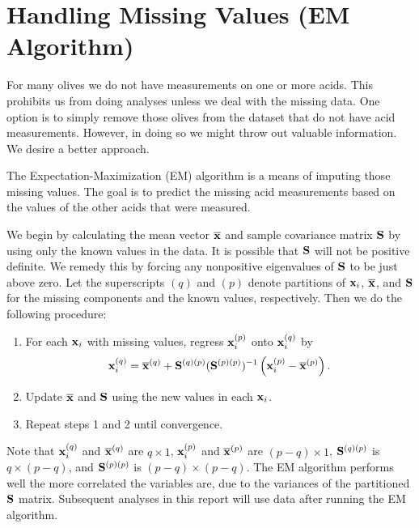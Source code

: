 \section{Handling Missing Values (EM Algorithm)}

For many olives we do not have measurements on one or more acids. This prohibits us from doing analyses unless we deal with the missing data. One option is to simply remove those olives from the dataset that do not have acid measurements. However, in doing so we might throw out valuable information. We desire a better approach.

The Expectation-Maximization (EM) algorithm is a means of imputing those missing values. The goal is to predict the missing acid measurements based on the values of the other acids that were measured.

We begin by calculating the mean vector $\overline{\mathbf{\bm{x}}}$ and sample covariance matrix $\mathbf{\bm{S}}$ by using only the known values in the data. It is possible that $\mathbf{\bm{S}}$ will not be positive definite. We remedy this by forcing any nonpositive eigenvalues of $\mathbf{\bm{S}}$ to be just above zero. Let the superscripts $(q)$ and $(p)$ denote partitions of $\mathbf{\bm{x}}_i$, $\overline{\mathbf{\bm{x}}}$, and $\mathbf{\bm{S}}$ for the missing components and the known values, respectively. Then we do the following procedure:

\begin{enumerate}
\item For each $\mathbf{\bm{x}}_i$ with missing values, regress $\mathbf{\bm{x}}_i^{(p)}$ onto $\mathbf{\bm{x}}_i^{(q)}$ by
\begin{eqnarray*}
\mathbf{\bm{x}}_i^{(q)} = \overline{\mathbf{\bm{x}}}^{(q)} + \mathbf{\bm{S}}^{(q)(p)}(\mathbf{\bm{S}}^{(p)(p)})^{-1}\left(\mathbf{\bm{x}}_i^{(p)}-\overline{\mathbf{\bm{x}}}^{(p)}\right). 
\end{eqnarray*}
\item Update $\overline{\mathbf{\bm{x}}}$ and $\mathbf{\bm{S}}$ using the new values in each $\mathbf{\bm{x}}_i$.
\item Repeat steps 1 and 2 until convergence.
\end{enumerate}

\noindent Note that $\mathbf{\bm{x}}_i^{(q)}$ and $\overline{\mathbf{\bm{x}}}^{(q)}$ are $q\times1$, $\mathbf{\bm{x}}_i^{(p)}$ and $\overline{\mathbf{\bm{x}}}^{(p)}$ are $(p-q)\times1$, $\mathbf{\bm{S}}^{(q)(p)}$ is $q\times(p-q)$, and $\mathbf{\bm{S}}^{(p)(p)}$ is $(p-q)\times(p-q)$. The EM algorithm performs well the more correlated the variables are, due to the variances of the partitioned $\mathbf{\bm{S}}$ matrix. Subsequent analyses in this report will use data after running the EM algorithm.

